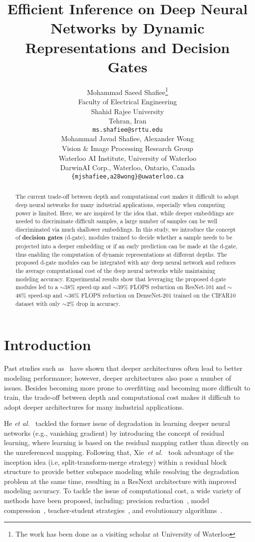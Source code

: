 \documentclass{article}
\title{Efficient Inference on Deep Neural Networks by Dynamic Representations and Decision Gates }
\author{
  Mohammad Saeed Shafiee\thanks{The work has been done as a visiting scholar at University of Waterloo} \\
  Faculty of Electrical Engineering\\
  Shahid Rajee University\\
  Tehran, Iran\\
  \texttt{ms.shafiee@srttu.edu} \\
  \And
  Mohammad Javad Shafiee, Alexander Wong \\
  Vision \& Image Processing Research Group\\
  Waterloo AI Institute, University of Waterloo \\
  DarwinAI Corp., Waterloo, Ontario, Canada\\
  \texttt{\{mjshafiee,a28wong\}@uwaterloo.ca} \\
}
\begin{document}
\maketitle
\vspace{-0.3 cm}
\begin{abstract}
\vspace{-0.3 cm}
 The current trade-off between depth and computational cost makes it difficult to adopt deep neural networks for many industrial applications, especially when computing power is limited. Here, we are inspired by the idea that, while deeper embeddings are needed to discriminate difficult samples, a large number of samples can be well discriminated via much shallower embeddings. In this study, we introduce the concept of \textbf{decision gates} (d-gate), modules trained to decide whether a sample needs to be projected into a deeper embedding or if an early prediction can be made at the d-gate, thus enabling the computation of dynamic representations at different depths.  The proposed d-gate modules can be integrated with any deep neural network and reduces the average computational cost of the deep neural networks while maintaining modeling accuracy. Experimental results show that leveraging the proposed d-gate modules led to a $\sim$38\% speed-up and $\sim$39\% FLOPS reduction on ResNet-101 and $\sim$46\% speed-up and $\sim$36\% FLOPS reduction on DenseNet-201 trained on the CIFAR10 dataset with only $\sim$2\% drop in accuracy.
\end{abstract}
\vspace{-0.4 cm}
\section{Introduction}
\vspace{-0.4 cm}
Past studies such as~\cite{simonyan2014very} have shown that deeper architectures often lead to better modeling performance; however, deeper architectures also pose a number of issues.  Besides becoming more prone to overfitting and becoming more difficult to train, the trade-off between depth and computational cost makes it difficult to adopt deeper architectures for many industrial applications.

He {\it et al.}~\cite{he2016deep} tackled the former issue of degradation in learning deeper neural networks (e.g., vanishing gradient) by introducing the concept of residual learning, where learning is based on the residual mapping rather than directly on the unreferenced mapping.  Following that, Xie~{\it et al.}~\cite{xie2017aggregated} took advantage of the inception idea (i.e, split-transform-merge strategy) within a residual block structure to provide better subspace modeling while resolving the degradation problem at the same time, resulting in a ResNext architecture with improved modeling accuracy.  To tackle the issue of computational cost, a wide variety of methods have been proposed, including: precision reduction~\cite{jacob2017quantization},  model compression~\cite{han2015deep}, teacher-student strategies~\cite{hinton2015distilling}, and evolutionary algorithms~\cite{javad2016evonet,shafiee2016evolutionary}.
\end{document}
